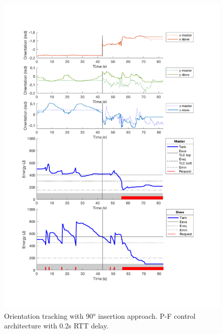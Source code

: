 \begin{center}
	\begin{figure}
		\includegraphics[width=\textwidth, keepaspectratio]{plots/pf90Delay/Orientation.pdf}
		\caption{Orientation tracking with 90° insertion approach. P-F control architecture with 0.2s RTT delay.}
		\label{graph:pf90Delay/Orientation}
	\end{figure}
\end{center}

